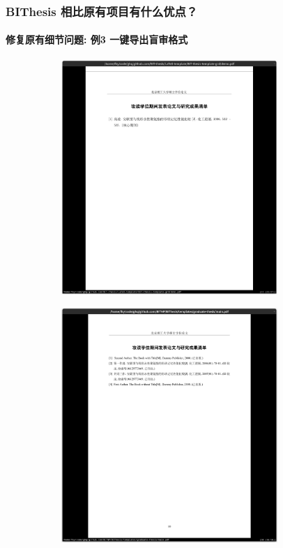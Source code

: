 \documentclass[
  aspectratio=169,
  presentation,
  titlegraphic=./images/bit.png,
  framelogo=./images/bit.png
]{bitbeamer}
\begin{document}
\begin{frame}[t]
  \frametitle{BIThesis 相比原有项目有什么优点？}
  \framesubtitle{修复原有细节问题: 例3 一键导出盲审格式}

  \vspace{-0.8cm}

  \begin{figure}
    \begin{subfigure}{0.45\textwidth}
      \includegraphics[width=0.9\textwidth]{images/7-1.png}
    \end{subfigure}
    \begin{subfigure}{0.45\textwidth}
      \includegraphics[width=0.9\textwidth]{images/7-2.png}
    \end{subfigure}
  \end{figure}
\end{frame}
\end{document}
